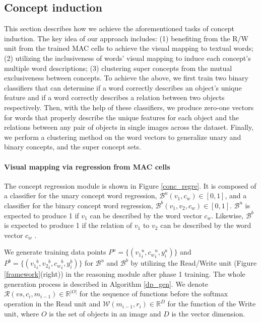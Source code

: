 \documentclass[10pt,twocolumn,letterpaper]{article}
\begin{document}
\subsection{Concept induction}
\vspace{-2mm}
\label{ssec:concept_induction}
This section describes how we achieve the aforementioned tasks of concept induction. The key idea of our approach includes: (1) benefiting from the R/W unit from the trained MAC cells to achieve the visual mapping to textual words; (2) utilizing the inclusiveness of words' visual mapping to induce each concept's multiple word descriptions; (3) clustering super concepts from the mutual exclusiveness between concepts.
To achieve the above, we first train two binary classifiers that can determine if a word correctly describes an object's unique feature and if a word correctly describes a relation between two objects respectively. Then, with the help of these classifiers, we produce zero-one vectors for words that properly describe the unique features for each object and the relations between any pair of objects in single images across the dataset. Finally, we perform a clustering method on the word vectors to generalize unary and binary concepts, and the super concept sets.

\vspace{-5mm}
\paragraph{Visual mapping via regression from MAC cells}
The concept regression module is shown in Figure \ref{conc_regre}. It is composed of a classifier for the unary concept word regression, $\mathcal{B}^u(v_1, c_w) \in [0,1]$, and a classifier for the binary concept word regression, $\mathcal{B}^b(v_1, v_2, c_w) \in [0,1]$. $\mathcal{B}^u$ is expected to produce 1 if $v_1$ can be described by the word vector $c_w$. Likewise, $\mathcal{B}^b$ is expected to produce 1 if the relation of $v_1$ to $v_2$ can be described by the word vector $c_w$ . 

We generate training data points $P^u=\{({v_1}_i^u,{c_w}_i^u,y_i^u)\}$ and $P^b=\{({v_1}_i^b,{v_2}_i^b,{c_w}_i^b,y_i^b)\}$ for $\mathcal{B}^u$ and $\mathcal{B}^b$ by utilizing the Read/Write unit (Figure \ref{framework}(right)) in the reasoning module after phase 1 training.
The whole generation process is described in Algorithm \ref{dp_gen}.
We denote $\mathcal{R}(vs,c_{i},m_{i-1}) \in \mathbb{R}^{|O|}$ for the sequence of functions before the softmax operation in the Read unit and $\mathcal{W}(m_{i-1},r_i) \in \mathbb{R}^D$ for the function of the Write unit, where $O$ is the set of objects in an image and $D$ is the vector dimension.
\end{document}

